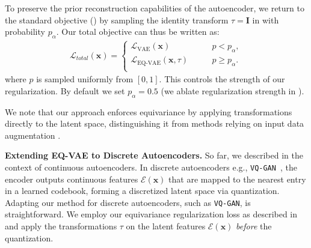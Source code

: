 To preserve the prior reconstruction capabilities of the autoencoder, we return to the standard objective () by sampling the identity transform \(\tau = \mathbf{I}\) in  with probability \(p_{\alpha}\). 
Our total objective can thus be written as:
\
\begin{align}
\mathcal{L}_{total}(\mathbf{x}) = 
\begin{cases}
    \mathcal{L}_{\text{VAE}}(\mathbf{x}) \qquad  & p <p_{\alpha}, \\
   \mathcal{L}_{\text{EQ-VAE}}(\mathbf{x}, \tau) \qquad &   p \geq p_{\alpha} . \\
\end{cases}
\end{align}
where $p$ is  sampled uniformly from $[0, 1]$. This controls the strength of our regularization. By default we set $p_{\alpha}=0.5$  (we ablate regularization strength in ).


We note that our approach enforces equivariance by applying transformations directly to the latent space, distinguishing it from methods relying on input data augmentation \cite{brehmer2024does}. 



\noindent \textbf{Extending EQ-VAE to Discrete Autoencoders.} So far, we described \our in the context of continuous autoencoders.
In discrete autoencoders e.g., \texttt{VQ-GAN}~\cite{esser2021taming}, the encoder outputs continuous features $\mathcal{E}(\mathbf{x})$ that are mapped to the nearest entry in a learned codebook, forming a discretized latent space via quantization. 
Adapting our method for discrete autoencoders, such as \texttt{VQ-GAN}, is straightforward. 
We employ our equivariance regularization loss as described in \secref{sec:method-eqvae} and apply the transformations $\tau$ on the latent features $\mathcal{E}(\mathbf{x})$ \emph{before} the quantization.

